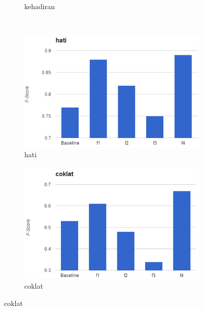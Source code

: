 \begin{figure}[H]
\begin{subfigure}{.5\textwidth}
		\caption{kehadiran}
	\end{subfigure}%
	\\
	\begin{subfigure}{.5\textwidth}
		\centering
		\includegraphics[width=1\linewidth]{adit_pics/hati.png}
		\caption{hati}
	\end{subfigure}%
	\begin{subfigure}{.5\textwidth}
		\centering
		\includegraphics[width=1\linewidth]{adit_pics/coklat.png}
		\caption{coklat}
	\end{subfigure}%
\end{figure}
\clearpage	
